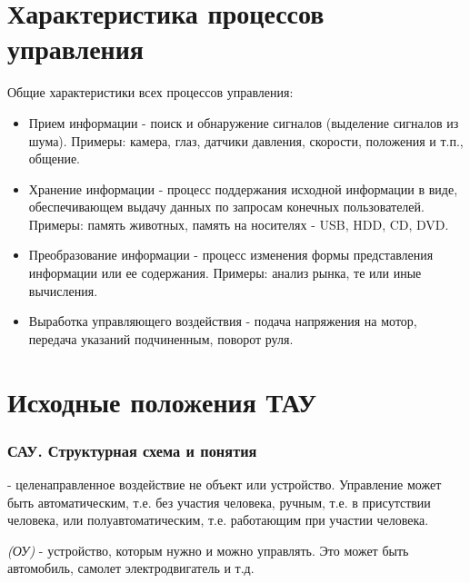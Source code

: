 \documentclass[TAU.tex]{subfiles}
\begin{document}
\section{Характеристика процессов управления}

Общие характеристики всех процессов управления:
\begin{itemize}
  \item Прием информации - поиск и обнаружение сигналов (выделение сигналов из шума). Примеры: камера, глаз, датчики давления, скорости, положения и т.п., общение.
  \item Хранение информации - процесс поддержания исходной информации в виде, обеспечивающем выдачу данных по запросам конечных пользователей. Примеры: память животных, память на носителях - USB, HDD, CD, DVD.
  \item Преобразование информации - процесс изменения формы представления информации или ее содержания. Примеры: анализ рынка, те или иные вычисления.
  \item Выработка управляющего воздействия - подача напряжения на мотор, передача указаний подчиненным, поворот руля. %
\end{itemize}

\section{Исходные положения ТАУ}
\subsubsection{САУ. Структурная схема и понятия}

 - целенаправленное воздействие не объект или устройство. Управление может быть автоматическим, т.е. без участия человека, ручным, т.е. в присутствии человека, или полуавтоматическим, т.е. работающим при участии человека.

 {\it (ОУ)} - устройство, которым нужно и можно управлять. Это может быть автомобиль, самолет электродвигатель и т.д.
\end{document}
